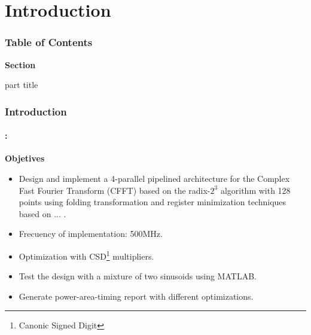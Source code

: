 

\section{Introduction}
\begin{frame}
  \frametitle{\textbf{Table of Contents}}
  \begin{center}
    {\vspace{-1.5cm}\Large \textbf{Section \thesection}\vspace{0.5cm}}
    \begin{beamercolorbox}[
      sep=8pt,center]{part title}
      \textbf{\insertsection}
    \end{beamercolorbox}
  \end{center}
\end{frame}


\begin{frame}
	\frametitle{\textbf{Introduction}}
	\framesubtitle{\secname : \subsecname}
	\begin{block}{\centering \textbf{Objetives}}
		\begin{itemize} \justifying\footnotesize
  			\item Design and implement a 4-parallel pipelined architecture for the Complex Fast Fourier Transform (CFFT) based on the radix-$2^3$ algorithm with 128 points 	using folding transformation and register minimization techniques based on ... .
   			\item Frecuency of implementation: 500MHz. 
  			\item Optimization with CSD\footnote{Canonic Signed Digit} multipliers.
  			\item Test the design with a mixture of two sinusoids using MATLAB.
  			\item Generate power-area-timing report with different
			optimizations. 			
  		\end{itemize}
    \end{block}
\end{frame}




